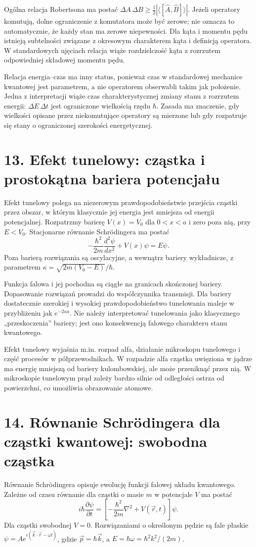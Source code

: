 \documentclass[11pt,a4paper,oneside]{report}
\begin{document}
Ogólna relacja Robertsona ma postać \(\Delta A\,\Delta B\geq\frac12|\langle[\hat A,\hat B]\rangle|\). Jeżeli operatory komutują, dolne ograniczenie z komutatora może być zerowe; nie oznacza to automatycznie, że każdy stan ma zerowe niepewności. Dla kąta i momentu pędu istnieją subtelności związane z okresowym charakterem kąta i definicją operatora. W standardowych ujęciach relacja wiąże rozdzielczość kąta z rozrzutem odpowiedniej składowej momentu pędu.

Relacja energia–czas ma inny status, ponieważ czas w standardowej mechanice kwantowej jest parametrem, a nie operatorem obserwabli takim jak położenie. Jedna z interpretacji wiąże czas charakterystycznej zmiany stanu z rozrzutem energii: \(\Delta E\,\Delta t\) jest ograniczone wielkością rzędu \(\hbar\). Zasada ma znaczenie, gdy wielkości opisane przez niekomutujące operatory są mierzone lub gdy rozpatruje się stany o ograniczonej szerokości energetycznej.

\section{13. Efekt tunelowy: cząstka i prostokątna bariera potencjału}
Efekt tunelowy polega na niezerowym prawdopodobieństwie przejścia cząstki przez obszar, w którym klasycznie jej energia jest mniejsza od energii potencjalnej. Rozpatrzmy barierę \(V(x)=V_0\) dla \(0<x<a\) i zero poza nią, przy \(E<V_0\). Stacjonarne równanie Schrödingera ma postać
\[
-\frac{\hbar^2}{2m}\frac{d^2\psi}{dx^2}+V(x)\psi=E\psi.
\]
Poza barierą rozwiązania są oscylacyjne, a wewnątrz bariery wykładnicze, z parametrem \(\kappa=\sqrt{2m(V_0-E)}/\hbar\).

Funkcja falowa i jej pochodna są ciągłe na granicach skończonej bariery. Dopasowanie rozwiązań prowadzi do współczynnika transmisji. Dla bariery dostatecznie szerokiej i wysokiej prawdopodobieństwo tunelowania maleje w przybliżeniu jak \(e^{-2\kappa a}\). Nie należy interpretować tunelowania jako klasycznego „przeskoczenia” bariery; jest ono konsekwencją falowego charakteru stanu kwantowego.

Efekt tunelowy wyjaśnia m.in. rozpad alfa, działanie mikroskopu tunelowego i część procesów w półprzewodnikach. W rozpadzie alfa cząstka uwięziona w jądrze ma energię mniejszą od bariery kulombowskiej, ale może przeniknąć przez nią. W mikroskopie tunelowym prąd zależy bardzo silnie od odległości ostrza od powierzchni, co umożliwia obrazowanie atomowe.

\section{14. Równanie Schrödingera dla cząstki kwantowej: swobodna cząstka}
Równanie Schrödingera opisuje ewolucję funkcji falowej układu kwantowego. Zależne od czasu równanie dla cząstki o masie \(m\) w potencjale \(V\) ma postać
\[
i\hbar\frac{\partial\psi}{\partial t}=
\left[-\frac{\hbar^2}{2m}\nabla^2+V(\vec r,t)\right]\psi.
\]
Dla cząstki swobodnej \(V=0\). Rozwiązaniami o określonym pędzie są fale płaskie \(\psi=Ae^{i(\vec k\cdot\vec r-\omega t)}\), gdzie \(\vec p=\hbar\vec k\), a \(E=\hbar\omega=\hbar^2k^2/(2m)\).
\end{document}
